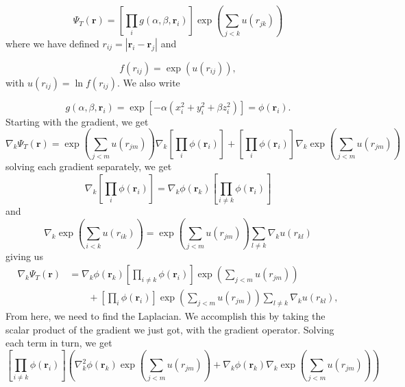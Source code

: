 \documentclass[11pt,a4paper,titlepage]{article}
\begin{document}
\begin{equation*}
\Psi_T(\mathbf{r})=\left[
    \prod_i g(\alpha,\beta,\mathbf{r}_i)
\right]
\exp{\left(\sum_{j<k}u(r_{jk})\right)}
\end{equation*}
where we have defined $r_{ij}=|\mathbf{r}_i-\mathbf{r}_j|$
and

\begin{equation*}
   f(r_{ij})= \exp{\left(u(r_{ij})\right)},
\end{equation*}
with $u(r_{ij})=\ln{f(r_{ij})}$.
We also write

\begin{equation*}
    g(\alpha,\beta,\mathbf{r}_i) = \exp{\left[-\alpha(x_i^2+y_i^2+\beta
    z_i^2)\right]}= \phi(\mathbf{r}_i).
\end{equation*}
Starting with the gradient, we get
\begin{equation}
  \nabla_k\Psi_T(\mathbf{r}) = \exp{\left(\sum_{j<m}u(r_{jm})\right)}\nabla_k\left[\prod_{i}\phi(\mathbf{r}_i)\right] + \left[\prod_{i}\phi(\mathbf{r}_i)\right]\nabla_k\exp{\left(\sum_{j<m}u(r_{jm})\right)}
\end{equation}
solving each gradient separately, we get
\begin{equation*}
\nabla_k\left[\prod_{i}\phi(\mathbf{r}_i)\right] = \nabla_k\phi(\mathbf{r}_k)\left[\prod_{i\ne k}\phi(\mathbf{r}_i)\right]
\end{equation*}
and 
\begin{equation*}
\nabla_k\exp{\left(\sum_{i<k}u(r_{ik})\right)} = \exp{\left(\sum_{j<m}u(r_{jm})\right)}\sum_{l\ne k}\nabla_k u(r_{kl})
\end{equation*}
giving us 
\begin{align*}
  \nabla_k\Psi_T(\mathbf{r}) &= \nabla_k\phi(\mathbf{r}_k)\left[\prod_{i\ne k}\phi(\mathbf{r}_i)\right]\exp{\left(\sum_{j<m}u(r_{jm})\right)}
  \\
  &\qquad
  +  \left[\prod_i\phi(\mathbf{r}_i)\right]
  \exp{\left(\sum_{j<m}u(r_{jm})\right)}\sum_{l\ne k}\nabla_k u(r_{kl}),
\end{align*}
From here, we need to find the Laplacian. We accomplish this by taking the scalar product of the gradient we just got, with the gradient operator. Solving each term in turn, we get
\begin{equation*}
\left[\prod_{i\ne k}\phi(\mathbf{r}_i)\right]\left( \nabla_k^2\phi(\mathbf{r}_k) \exp{\left(\sum_{j<m}u(r_{jm})\right)} + \nabla_k\phi(\mathbf{r}_k)\nabla_k\exp{\left(\sum_{j<m}u(r_{jm})\right)}\right)
\end{equation*}
\end{document}
